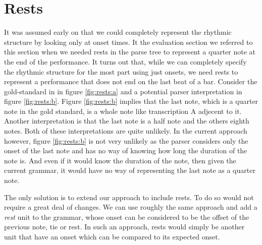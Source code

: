 \section{Rests}

It was assumed early on that we could completely represent the rhythmic structure by looking only at onset times. It the evaluation section we referred to this section when we needed rests in the parse tree to represent a quarter note at the end of the performance. It turns out that, while we can completely specify the rhythmic structure for the most part using just onsets, we need rests to represent a performance that does not end on the last beat of a bar. Consider the gold-standard in in figure \ref{fig:rests:a} and a potential parser interpretation in figure \ref{fig:rests:b}. Figure \ref{fig:rests:b} implies that the last note, which is a quarter note in the gold standard, is a whole note like transcription A adjecent to it. Another interpretation is that the last note is a half note and the others eighth notes. Both of these interpretations are quite unlikely. In the current approach however, figure \ref{fig:rests:b} is not very unlikely as the parser considers only the onset of the last note and has no way of knowing how long the duration of the note is. And even if it would know the duration of the note, then given the current grammar, it would have no way of representing the last note as a quarter note. 

The only solution is to extend our approach to include rests. To do so would not require a great deal of changes. We can use roughly the same approach and add a \textit{rest} unit to the grammar, whose onset can be considered to be the offset of the previous note, tie or rest. In such an approach, rests would simply be another unit that have an onset which can be compared to its expected onset.

